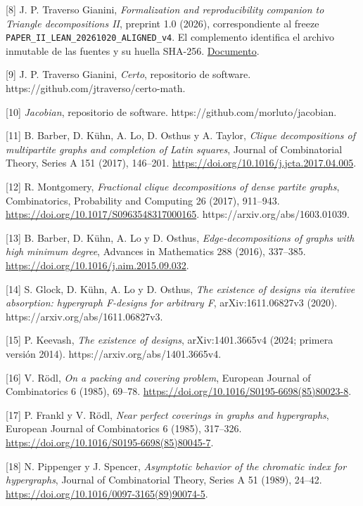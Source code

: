 \documentclass[spanish,11pt,a4paper]{article}
\begin{document}
{[}8{]} J. P. Traverso Gianini, \emph{Formalization and reproducibility companion to Triangle decompositions II}, preprint 1.0 (2026), correspondiente al freeze \texttt{PAPER\_\allowbreak{}II\_\allowbreak{}LEA\allowbreak{}N\_\allowbreak{}20261020\_\allowbreak{}A\allowbreak{}LIGNED\_\allowbreak{}v4}. El complemento identifica el archivo inmutable de las fuentes y su huella SHA-256. \href{https://github.com/jtraverso/nash-williams-triangle-decompositions-release/blob/main/preprints/PAPER_II/05_formalization/FORMALIZATION_COMPANION_preprint_v1.0_es.md}{Documento}.

{[}9{]} J. P. Traverso Gianini, \emph{Certo}, repositorio de software. https://github.com/jtraverso/certo-math.

{[}10{]} \emph{Jacobian}, repositorio de software. https://github.com/morluto/jacobian.

{[}11{]} B. Barber, D. Kühn, A. Lo, D. Osthus y A. Taylor, \emph{Clique decompositions of multipartite graphs and completion of Latin squares}, Journal of Combinatorial Theory, Series A 151 (2017), 146--201. \url{https://doi.org/10.1016/j.jcta.2017.04.005}.

{[}12{]} R. Montgomery, \emph{Fractional clique decompositions of dense partite graphs}, Combinatorics, Probability and Computing 26 (2017), 911--943. \url{https://doi.org/10.1017/S0963548317000165}. https://arxiv.org/abs/1603.01039.

{[}13{]} B. Barber, D. Kühn, A. Lo y D. Osthus, \emph{Edge-decompositions of graphs with high minimum degree}, Advances in Mathematics 288 (2016), 337--385. \url{https://doi.org/10.1016/j.aim.2015.09.032}.

{[}14{]} S. Glock, D. Kühn, A. Lo y D. Osthus, \emph{The existence of designs via iterative absorption: hypergraph F-designs for arbitrary F}, arXiv:1611.06827v3 (2020). https://arxiv.org/abs/1611.06827v3.

{[}15{]} P. Keevash, \emph{The existence of designs}, arXiv:1401.3665v4 (2024; primera versión 2014). https://arxiv.org/abs/1401.3665v4.

{[}16{]} V. Rödl, \emph{On a packing and covering problem}, European Journal of Combinatorics 6 (1985), 69--78. \url{https://doi.org/10.1016/S0195-6698(85)80023-8}.

{[}17{]} P. Frankl y V. Rödl, \emph{Near perfect coverings in graphs and hypergraphs}, European Journal of Combinatorics 6 (1985), 317--326. \url{https://doi.org/10.1016/S0195-6698(85)80045-7}.

{[}18{]} N. Pippenger y J. Spencer, \emph{Asymptotic behavior of the chromatic index for hypergraphs}, Journal of Combinatorial Theory, Series A 51 (1989), 24--42. \url{https://doi.org/10.1016/0097-3165(89)90074-5}.
\end{document}
